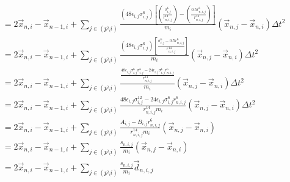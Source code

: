 \documentclass{article}
\begin{document}
\begin{align}
	&=2\vec{x}_{n,i}-\vec{x}_{n-1,i}+\sum_{j\in (p\setminus i)}\frac{\left(48\epsilon_{i,j}\sigma_{i,j}^{6}\right)\left[\left(\frac{\sigma_{i,j}^{6}}{r_{n,i,j}^{14}}\right)-\left(\frac{0.5r_{n,i,j}^6}{r_{n,i,j}^{14}}\right)\right]}{m_i}\left(\vec{x}_{n,j}-\vec{x}_{n,i}\right)\Delta t^2\\
	&=2\vec{x}_{n,i}-\vec{x}_{n-1,i}+\sum_{j\in (p\setminus i)}\frac{\left(48\epsilon_{i,j}\sigma_{i,j}^{6}\right)\left[\frac{\sigma_{i,j}^{6}-0.5r_{n,i,j}^6}{r_{n,i,j}^{14}}\right]}{m_i}\left(\vec{x}_{n,j}-\vec{x}_{n,i}\right)\Delta t^2\\
	&=2\vec{x}_{n,i}-\vec{x}_{n-1,i}+\sum_{j\in (p\setminus i)}\frac{\frac{48\epsilon_{i,j}\sigma_{i,j}^{6}\sigma_{i,j}^{6}-24\epsilon_{i,j}\sigma_{i,j}^{6}r_{n,i,j}^6}{r_{n,i,j}^{14}}}{m_i}\left(\vec{x}_{n,j}-\vec{x}_{n,i}\right)\Delta t^2\\
	&=2\vec{x}_{n,i}-\vec{x}_{n-1,i}+\sum_{j\in (p\setminus i)}\frac{48\epsilon_{i,j}\sigma_{i,j}^{12}-24\epsilon_{i,j}\sigma_{i,j}^{6}r_{n,i,j}^6}{r_{n,i,j}^{14}m_i}\left(\vec{x}_{n,j}-\vec{x}_{n,i}\right)\Delta t^2\\
	&=2\vec{x}_{n,i}-\vec{x}_{n-1,i}+\sum_{j\in (p\setminus i)}\frac{A_{i,j}-B_{i,j}r_{n,i,j}^6}{r_{n,i,j}^{14}m_i}\left(\vec{x}_{n,j}-\vec{x}_{n,i}\right)\\
	&=2\vec{x}_{n,i}-\vec{x}_{n-1,i}+\sum_{j\in (p\setminus i)}\frac{s_{n,i,j}}{m_i}\left(\vec{x}_{n,j}-\vec{x}_{n,i}\right)\\
	&=2\vec{x}_{n,i}-\vec{x}_{n-1,i}+\sum_{j\in (p\setminus i)}\frac{s_{n,i,j}}{m_i}\vec{d}_{n,i,j}\\
\end{align}
\end{document}

